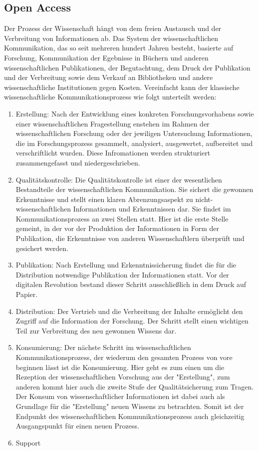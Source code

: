 \subsection{Open Access} 
Der Prozess der Wissenschaft hängt von dem freien Austausch und der Verbreitung von Informationen ab\cite{cite:11}. Das System der wissenschaftlichen Kommunikation, das so seit mehreren hundert Jahren besteht, basierte auf Forschung, Kommunikation der Egebnisse in Büchern und anderen wissenschaftlichen Publikationen, der Begutachtung, dem Druck der Publikation und der Verbreitung sowie dem Verkauf an Bibliotheken und andere wissenschaftliche Institutionen gegen Kosten\cite{cite:11a}. Vereinfacht kann der klassische wissenschaftliche Kommunikationsprozess\cite{cite:11b} wie folgt unterteilt werden:
\begin{enumerate}
\item Erstellung: 
Nach der Entwicklung eines konkreten Forschungsvorhabens sowie einer wissenschaftlichen Fragestellung enstehen im Rahmen der wissenschaftlichen Forschung oder der jewiligen Untersuchung Informationen\cite{cite:11c}, die im Forschungsprozess gesammelt, analysiert, ausgewertet, aufbereitet und verschriftlicht wurden\cite{cite:11d}. Diese Infromationen werden strukturiert zusammengefasst und niedergeschrieben.\cite{cite:11d}
\item Qualitätskontrolle: 
Die Qualitätskontrolle ist einer der wesentlichen Bestandteile der wissenschaftlichen Kommunikation. Sie sichert die gewonnen Erkenntnisse\cite{cite:11e} und stellt einen klaren Abrenzungsaspekt zu nicht-wissenschaftlichen Informationen und Erkenntnissen dar\cite{cite:11f}. Sie findet im Kommunikationsprozess an zwei Stellen statt. Hier ist die erste Stelle gemeint, in der vor der Produktion der Informationen in Form der Publikation, die Erkenntnisse von anderen Wissenschaftlern überprüft und gesichert werden.\cite{cite:11g}
\item Publikation: 
Nach Erstellung und Erkenntnissicherung findet die für die Distribution notwendige Publikation der Informationen statt. Vor der digitalen Revolution bestand dieser Schritt ausschließlich in dem Druck auf Papier.\cite{cite:11h}
\item Distribution: 
Der Vertrieb und die Verbreitung der Inhalte ermöglicht den Zugriff auf die Information der Forschung. Der Schritt stellt einen wichtigen Teil zur Verbreitung des neu gewonnen Wissens dar\cite{cite:11i}.
\item Konsumierung: 
Der nächste Schritt im wissenschaftlichen Kommunikationsprozess, der wiederum den gesamten Prozess von vore beginnen lässt ist die Konsumierung. Hier geht es zum einen um die Rezeption der wissenschaftlichen Vorschung aus der "Erstellung", zum anderen kommt hier auch die zweite Stufe der Qualitätsicherung zum Tragen.\cite{cite:11j} Der Konsum von wissenschaftlicher Informationen ist dabei auch als Grundlage für die "Erstellung" neuen Wissens zu betrachten. Somit ist der Endpunkt des wissenschaftlichen Kommunikationsprozess auch gleichzeitig Ausgangspunkt für einen neuen Prozess\cite{cite:11k}.
\item Support
\end{enumerate}

